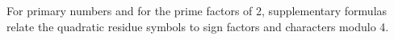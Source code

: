 For primary numbers and for the prime factors of 2, supplementary formulas relate the quadratic residue symbols to sign factors and characters modulo 4.
